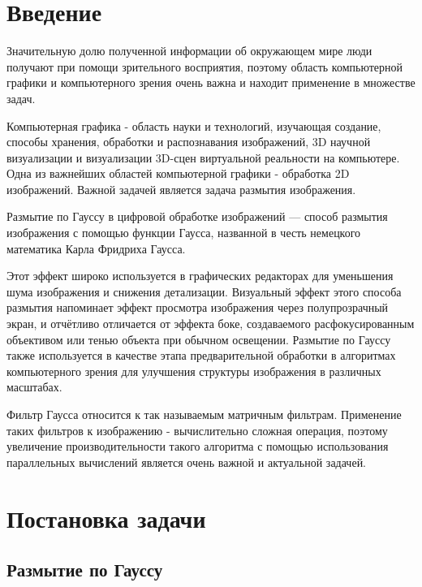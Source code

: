 \documentclass{article}
\begin{document}
\tableofcontents
\newpage

\section*{Введение}
\par
Значительную долю полученной информации об окружающем мире
люди получают при помощи зрительного восприятия, поэтому область компьютерной графики и компьютерного зрения очень важна и находит применение в множестве задач.
\par
Компьютерная графика - область науки и технологий, изучающая
создание, способы хранения, обработки и распознавания изображений, 3D
научной визуализации и визуализации 3D-сцен виртуальной реальности на
компьютере. Одна из важнейших областей компьютерной графики - обработка 2D изображений. Важной задачей является задача размытия изображения.
\par
Размытие по Гауссу в цифровой обработке изображений — способ размытия изображения с помощью функции Гаусса, названной в честь немецкого математика Карла Фридриха Гаусса.
\par
Этот эффект широко используется в графических редакторах для уменьшения шума изображения и снижения детализации. Визуальный эффект этого способа размытия напоминает эффект просмотра изображения через полупрозрачный экран, и отчётливо отличается от эффекта боке, создаваемого расфокусированным объективом или тенью объекта при обычном освещении. Размытие по Гауссу также используется в качестве этапа предварительной обработки в алгоритмах компьютерного зрения для улучшения структуры изображения в различных масштабах. 
\par
Фильтр Гаусса относится к так называемым матричным фильтрам. Применение таких фильтров к изображению - вычислительно сложная операция, поэтому увеличение производительности такого алгоритма с помощью использования параллельных вычислений является очень важной и актуальной задачей.
\newpage

\section*{Постановка задачи}
\subsection*{Размытие по Гауссу}
\end{document}
